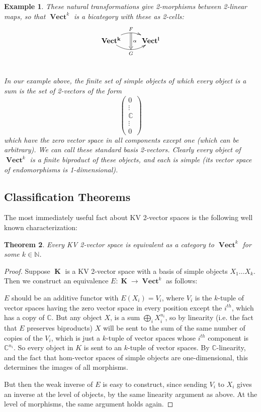 \documentclass[10pt]{amsart}
\newtheorem{theorem}{Theorem}
\numberwithin{theorem}{subsection}
\newtheorem{varexample}[theorem]{Example}
\newenvironment{example}{\begin{varexample}\em}{\em\end{varexample}}
\newcommand{\ra}{\mathop{\rightarrow}}
\newcommand{\opname}[1]{\operatorname{#1}}
\newcommand{\catname}[1]{\boldsymbol{\opname{{#1}}}}
\newcommand{\V}{\catname{Vect}}
\begin{document}
\begin{example}
These natural transformations give 2-morphisms between 2-linear maps, so
that $\V^k$ is a bicategory with these as 2-cells:
  \begin{equation}\label{xy:2vs2cell}
    \xymatrix{
      \catname{Vect^k} \ar@/^1pc/[r]^{F}="0"
      \ar@/_1pc/[r]_{G}="1" & \catname{Vect^l} \\ \ar@{=>}"0"
      ;"1"^{\alpha}
    }
  \end{equation}

In our example above, the finite set of simple objects of which every
object is a sum is the set of 2-vectors of the form
\begin{equation}
\begin{pmatrix}
0 \\
\vdots \\
\mathbb{C} \\
\vdots \\
0
\end{pmatrix}
\end{equation}
which have the zero vector space in all components except one (which
can be arbitrary).  We can call these \textit{standard basis
2-vectors}.  Clearly every object of $\V^k$ is a finite biproduct of
these objects, and each is simple (its vector space of endomorphisms
is 1-dimensional).
\end{example}

\subsection{Classification Theorems}

The most immediately useful fact about KV 2-vector spaces is the
following well known characterization:

\begin{theorem}\label{thm:kvvn} Every KV 2-vector space is equivalent as a category
to $\V^k$ for some $k \in \mathbb{N}$.
\end{theorem}
\begin{proof}
Suppose $\catname{K}$ is a KV 2-vector space with a basis of simple
objects $X_1 \dots X_k$.  Then we construct an equivalence $E:
\catname{K} \ra \V^k$ as follows:

$E$ should be an additive functor with $E(X_i) = V_i$, where $V_i$ is
the $k$-tuple of vector spaces having the zero vector space in every
position except the $i^{th}$, which has a copy of $\mathbb{C}$.  But
any object $X$, is a sum $\bigoplus_{i} X_i^{n_i}$, so by linearity
(i.e. the fact that $E$ preserves biproducts) $X$ will be sent to the
sum of the same number of copies of the $V_i$, which is just a
$k$-tuple of vector spaces whose $i^{th}$ component is
$\mathbb{C}^{n_i}$.  So every object in $K$ is sent to an $k$-tuple
of vector spaces.  By $\mathbb{C}$-linearity, and the fact that
hom-vector spaces of simple objects are one-dimensional, this
determines the images of all morphisms.

But then the weak inverse of $E$ is easy to construct, since sending
$V_i$ to $X_i$ gives an inverse at the level of objects, by the same
linearity argument as above. At the level of morphisms, the same
argument holds again.
\end{proof}
\end{document}
